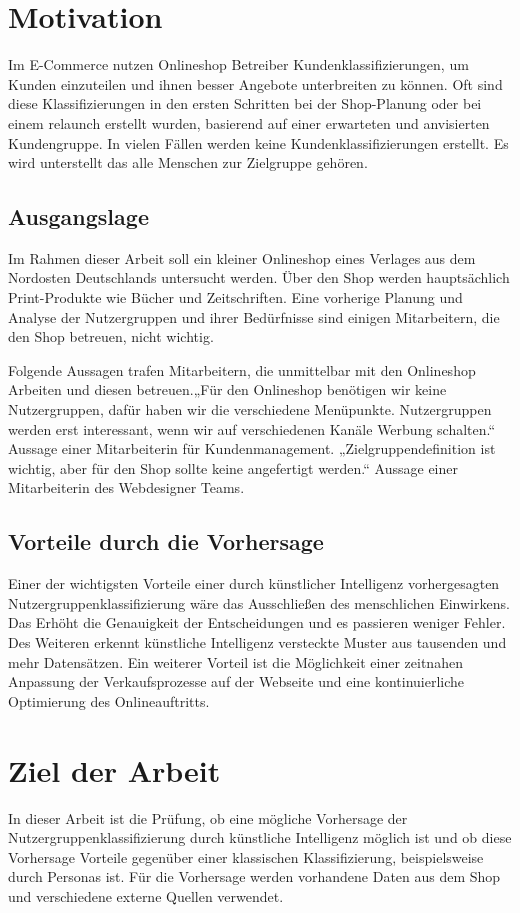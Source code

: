 \section{Motivation}
Im E-Commerce nutzen Onlineshop Betreiber Kundenklassifizierungen, um Kunden einzuteilen und ihnen besser Angebote unterbreiten zu können. Oft sind diese Klassifizierungen in den ersten Schritten bei der Shop-Planung oder bei einem \Gls{relaunch} erstellt wurden, basierend auf einer erwarteten und anvisierten Kundengruppe. In vielen Fällen werden keine Kundenklassifizierungen erstellt. Es wird unterstellt das alle Menschen zur Zielgruppe gehören.

\subsection{Ausgangslage}
Im Rahmen dieser Arbeit soll ein kleiner Onlineshop eines Verlages aus dem Nordosten Deutschlands untersucht werden. Über den Shop werden hauptsächlich Print-Produkte wie Bücher und Zeitschriften. Eine vorherige Planung und Analyse der Nutzergruppen und ihrer Bedürfnisse sind einigen Mitarbeitern, die den Shop betreuen, nicht wichtig.\vspace{0.2cm}

Folgende Aussagen trafen Mitarbeitern, die unmittelbar mit den Onlineshop Arbeiten und diesen betreuen.„Für den Onlineshop benötigen wir keine Nutzergruppen, dafür haben wir die verschiedene Menüpunkte. Nutzergruppen werden erst interessant, wenn wir auf verschiedenen Kanäle Werbung schalten.“ Aussage einer Mitarbeiterin für Kundenmanagement. „Zielgruppendefinition ist wichtig, aber für den Shop sollte keine angefertigt werden.“ Aussage einer Mitarbeiterin des Webdesigner Teams.

\subsection{Vorteile durch die Vorhersage}
Einer der wichtigsten Vorteile einer durch künstlicher Intelligenz vorhergesagten Nutzergruppenklassifizierung wäre das Ausschließen des menschlichen Einwirkens. Das Erhöht die Genauigkeit der Entscheidungen und es passieren weniger Fehler. Des Weiteren erkennt künstliche Intelligenz versteckte Muster aus tausenden und mehr Datensätzen. Ein weiterer Vorteil ist die Möglichkeit einer zeitnahen Anpassung der Verkaufsprozesse auf der Webseite und eine kontinuierliche Optimierung des Onlineauftritts.

\section{Ziel der Arbeit}
In dieser Arbeit ist die Prüfung, ob eine mögliche Vorhersage der Nutzergruppenklassifizierung durch künstliche Intelligenz möglich ist und ob diese Vorhersage Vorteile gegenüber einer klassischen Klassifizierung, beispielsweise durch Personas ist. Für die Vorhersage werden vorhandene Daten aus dem Shop und verschiedene externe Quellen verwendet.\vspace{0.2cm}

